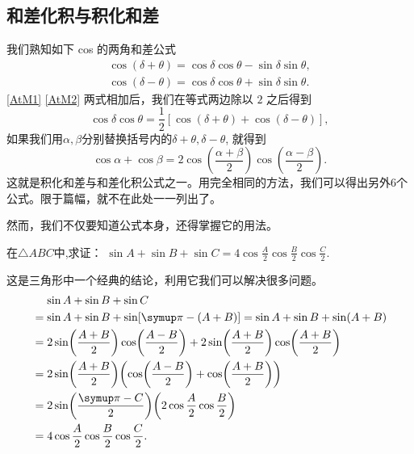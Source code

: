 \subsection{和差化积与积化和差}
\label{积化和差}

我们熟知如下 cos 的两角和差公式
\begin{gather}
    \cos(\delta +\theta )=\cos \delta  \cos \theta -\sin \delta  \sin \theta,\label{AtM1}\\
    \cos (\delta -\theta )=\cos \delta  \cos \theta +\sin \delta  \sin \theta.\label{AtM2}
\end{gather}
\eqref{AtM1} \eqref{AtM2} 两式相加后，我们在等式两边除以 $2$ 之后得到
\begin{equation}
    \cos \delta  \cos \theta=\frac{1}{2}[\cos(\delta +\theta )+\cos (\delta -\theta )],
\end{equation}
如果我们用$\alpha,\beta$分别替换括号内的$\delta +\theta,\delta -\theta$, 就得到
\begin{equation}
    \cos \alpha + \cos \beta = 2\cos\left( \frac{\alpha+\beta}{2} \right) \cos\left( \frac{\alpha-\beta}{2} \right) .
\end{equation}
这就是积化和差与和差化积公式之一。用完全相同的方法，我们可以得出另外6个公式。限于篇幅，就不在此处一一列出了。

然而，我们不仅要知道公式本身，还得掌握它的用法。

\begin{example}
    在$\bigtriangleup ABC $中,求证：%
    $\sin A+\sin B+\sin C=4\cos \frac{A}{2}\cos \frac{B}{2}\cos \frac{C}{2}$.
\end{example}


\begin{prove}
    这是三角形中一个经典的结论，利用它我们可以解决很多问题。
    \[
        \begin{aligned}
             & \mathrel{\phantom{=}}\sin A+\sin B+\sin C                                                                                        \\
             & =\sin A+\sin B+\sin [\symup\pi -(A+B)] =\sin A+\sin B+\sin(A+B)                                                                  \\
             & =2\sin\left( \frac{A+B}{2}\right)\cos\left( \frac{A-B}{2}\right)+2\sin\left( \frac{A+B}{2}\right)\cos\left( \frac{A+B}{2}\right) \\
             & =2\sin\left( \frac{A+B}{2}\right)\left (\cos\left( \frac{A-B}{2}\right)+\cos\left( \frac{A+B}{2}\right)\right )                  \\
             & =2\sin\left( \frac{\symup\pi -C}{2} \right) \left (2\cos\frac{A}{2}\cos\frac{B}{2}\right )                                       \\
             & =4\cos \frac{A}{2}\cos \frac{B}{2}\cos \frac{C}{2}.
        \end{aligned}
    \]
\end{prove}

